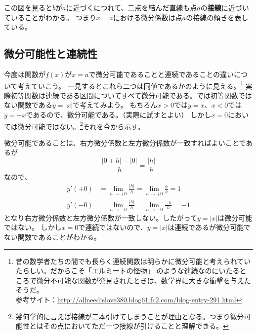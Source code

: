 \documentclass[a4j,dvipdfmx]{jsarticle}
\begin{document}
            この図を見ると$b$が$a$に近づくにつれて、二点を結んだ直線も点$a$の\textbf{接線}に近づいていることがわかる。
            つまり$x=a$における微分係数は点$a$の接線の傾きを表している。
        \clearpage
        \subsection{微分可能性と連続性}
            今度は関数が$f(x)$が$x=a$で微分可能であることと連続であることの違いについて考えていこう。
            一見するとこれら二つは同値であるかのように見える。\footnote{昔の数学者たちの間でも長らく連続関数は明らかに微分可能と考えられていたらしい。だからこそ「エルミートの怪物」
            のような連続なのにいたるところで微分不可能な関数が発見されたときは、数学界に大きな衝撃を与えたそうだ。\\参考サイト：\url{http://allneedislove380.blog61.fc2.com/blog-entry-291.html}}
            実際初等関数は連続である区間についてすべて微分可能である。では初等関数ではない関数である$y=|x|$で考えてみよう。
            もちろん$x>0$では$y=x$、$x<0$では$y=-x$であるので、微分可能である。（実際に試すとよい）
            しかし$x=0$においては微分可能ではない。\footnote{幾何学的に言えば接線が二本引けてしまうことが理由となる。つまり微分可能性とはその点においてただ一つ接線が引けることと理解できる。\label{微分可能性の幾何学的意味}}それを今から示す。

            微分可能であることは、右方微分係数と左方微分係数が一致すればよいことであるが
            \begin{equation}
                \frac{|0+h|-|0|}{h}=\frac{|h|}{h}
            \end{equation}
            なので、
            \begin{align}
                y'(+0)&=\lim_{h\to +0}\frac{|h|}{h}=\lim_{h\to+0}\frac{h}{h}=1\\
                y'(-0)&=\lim_{h\to -0}\frac{|h|}{h}=\lim_{h\to -0}\frac{-h}{h}=-1
            \end{align}
            となり右方微分係数と左方微分係数が一致しない。したがって$y=|x|$は微分可能ではない。
            しかし$x=0$で連続ではないので、$y=|x|$は連続であるが微分可能でない関数であることがわかる。
\end{document}
